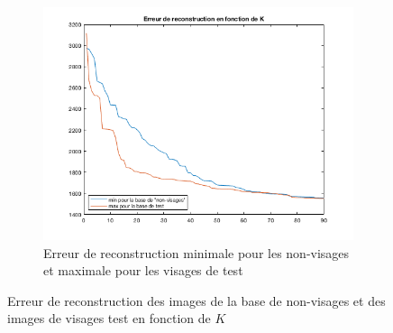 \documentclass[a4paper]{article}
\begin{document}
\begin{figure}[H]
    \begin{subfigure}[c]{0.6\textwidth}
        \centering
        \includegraphics[width=\textwidth]{images/ex5_err_min-noface_max-test}
        \caption{Erreur de reconstruction minimale pour les non-visages et
        maximale pour les visages de test}
        \label{subfig:ex5_min-noface_max-face}
    \end{subfigure}
    
    \caption{Erreur de reconstruction des images de la base de non-visages et
    des images de visages test en fonction de $K$} 
    \label{fig:ex5-err}
\end{figure}
\end{document}
